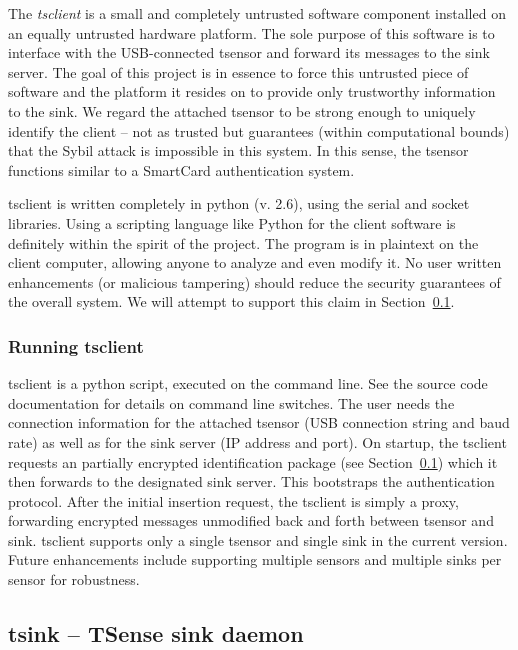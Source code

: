 The \textit{tsclient} is a small and completely untrusted software component installed on an equally untrusted hardware platform. The sole purpose of this software is to interface with the USB-connected tsensor and forward its messages to the sink server. The goal of this project is in essence to force this untrusted piece of software and the platform it resides on to provide only trustworthy information to the sink. 
%
We regard the attached tsensor to be strong enough to uniquely identify the client -- not as trusted but guarantees (within computational bounds) that the Sybil attack  is impossible in this system. In this sense, the tsensor functions similar to a SmartCard authentication system.

tsclient is written completely in python (v. 2.6), using the serial and socket libraries. Using a scripting language like Python for the client software is definitely within the spirit of the project. The program is in plaintext on the client computer, allowing anyone to analyze and even modify it. No user written enhancements (or malicious tampering) should reduce the security guarantees of the overall system. We will attempt to support this claim in Section~\ref{}.

\subsubsection{Running tsclient}

tsclient is a python script, executed on the command line. See the source code documentation for details on command line switches. The user needs the connection information for the attached tsensor (USB connection string and baud rate) as well as for the sink server (IP address and port). On startup, the tsclient requests an partially encrypted identification package (see Section~\ref{}) which it then forwards to the designated sink server. This bootstraps the authentication protocol. After the initial insertion request, the tsclient is simply a proxy, forwarding encrypted messages unmodified back and forth between tsensor and sink. tsclient supports only a single tsensor and single sink in the current version. Future enhancements include supporting multiple sensors and multiple sinks per sensor for robustness.

\subsection{tsink -- TSense sink daemon}

